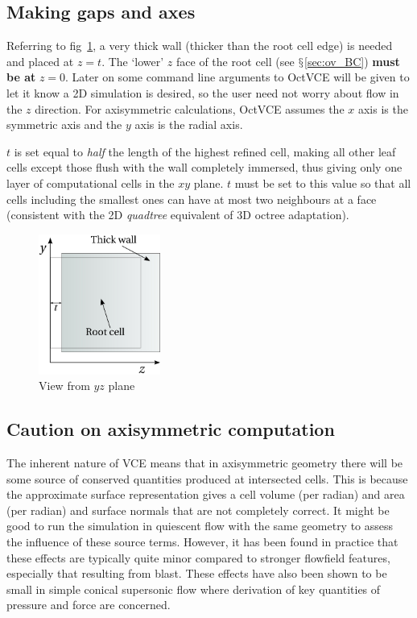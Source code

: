 \documentclass[pdftex, 12pt, a4paper]{report}
\begin{document}
\subsection{Making gaps and axes}\label{sec:2D_thickness}

Referring to fig~\ref{fig:yz_plane}, a very thick wall (thicker than the root cell edge) is needed and placed
at $z = t$.  The `lower' $z$ face of the root cell (see $\mathsection$\ref{sec:ov_BC}) \textbf{must be at} $z = 0$.
Later on some command line arguments to OctVCE will be given to let it know a 2D simulation is desired, so the user
need not worry about flow in the $z$ direction.  For axisymmetric calculations, OctVCE assumes the $x$ axis is the symmetric
axis and the $y$ axis is the radial axis.

$t$ is set equal to \emph{half} the length of the highest refined cell, making all 
other leaf cells except those flush with the wall completely immersed, thus giving only one layer of computational cells in 
the $xy$ plane.  $t$ must be set to this value so that all cells including
the smallest ones can have at most two neighbours at a face (consistent with the 2D \emph{quadtree} equivalent of 3D octree adaptation).

\begin{figure}[htp]
\centering
\includegraphics[width=4cm]{pics/twoD_thickness.jpg}
\caption{View from $yz$ plane}
\label{fig:yz_plane}
\end{figure}

\subsection{Caution on axisymmetric computation}\label{sec:axisym_caution}

The inherent nature of VCE means that in axisymmetric geometry there will be some source of conserved quantities produced at
intersected cells.  This is because the approximate surface representation
gives a cell volume (per radian) and area (per radian) and surface normals that are not completely correct.  It might be good to 
run the simulation in quiescent flow with the same geometry to assess the influence of these source terms.  
However, it has been found in practice that these effects are typically quite minor compared to stronger flowfield features, especially 
that resulting from blast.  These effects have also been shown to be small in simple conical supersonic flow \cite{Tang:asm} where
derivation of key quantities of pressure and force are concerned.
\end{document}
